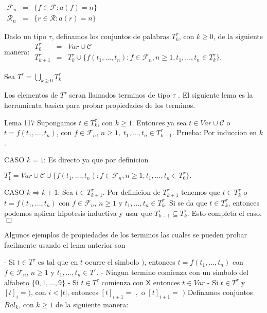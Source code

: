 \(\displaystyle \begin{array}{rcl} \mathcal{F}_{n} & =& \{f\in \mathcal{F}:a(f)=n\} \\ \mathcal{R}_{n} & =& \{r\in \mathcal{R}:a(r)=n\} \end{array} \)

Dado un tipo \(\tau \), definamos los conjuntos de palabras \(T_{k}^{\tau }\), con \(k\geq 0\), de la siguiente manera:
\(\displaystyle \begin{array}{rcl} T_{0}^{\tau } & =& Var\cup \mathcal{C} \\ T_{k+1}^{\tau } & =& T_{k}^{\tau }\cup \{f(t_{1},...,t_{n}):f\in \mathcal{F} _{n},n\geq 1,t_{1},...,t_{n}\in T_{k}^{\tau }\}. \end{array} \)

Sea
\(\displaystyle T^{\tau }=\bigcup_{k\geq 0}T_{k}^{\tau } \)

Los elementos de \(T^{\tau }\) seran llamados terminos de tipo \(\tau \) .
El siguiente lema es la herramienta basica para probar propiedades de los terminos.

Lema 117 Supongamos \(t\in T_{k}^{\tau }\), con \(k\geq 1\). Entonces ya sea \(t\in Var\cup \mathcal{C}\) o \(t=f(t_{1},...,t_{n})\), con \(f\in \mathcal{F }_{n}\), \(n\geq 1,\;t_{1},...,t_{n}\in T_{k-1}^{\tau }\).
Prueba: Por induccion en \(k\).

CASO \(k=1\): Es directo ya que por definicion

\(\displaystyle T_{1}^{\tau }=Var\cup \mathcal{C}\cup \{f(t_{1},...,t_{n}):f\in \mathcal{F} _{n},n\geq 1,t_{1},...,t_{n}\in T_{0}^{\tau }\}. \)

CASO \(k\Rightarrow k+1\): Sea \(t\in T_{k+1}^{\tau }\). Por definicion de \( T_{k+1}^{\tau }\) tenemos que \(t\in T_{k}^{\tau }\) o \(t=f(t_{1},...,t_{n})\) con \(f\in \mathcal{F}_{n}\), \(n\geq 1\) y \(t_{1},...,t_{n}\in T_{k}^{\tau }\). Si se da que \(t\in T_{k}^{\tau }\), entonces podemos aplicar hipotesis inductiva y usar que \(T_{k-1}^{\tau }\subseteq T_{k}^{\tau }\). Esto completa el caso. \(\Box\)

Algunos ejemplos de propiedades de los terminos las cuales se pueden probar facilmente usando el lema anterior son

- Si \(t\in T^{\tau }\) es tal que en \(t\) ocurre el simbolo \()\), entonces \(t=f(t_{1},...,t_{n})\) con \(f\in \mathcal{F}_{n}\), \(n\geq 1\) y \( t_{1},...,t_{n}\in T^{\tau }\).
- Ningun termino comienza con un simbolo del alfabeto \(\{\mathit{0}, \mathit{1},...,\mathit{9}\}\)
- Si \(t\in T^{\tau }\) comienza con \(\mathsf{X}\) entonces \(t\in Var\)
- Si \(t\in T^{\tau }\) y \(\left[ t\right] _{i}=)\), con \(i< \left\vert t\right\vert \), entonces \(\left[ t\right] _{i+1}=\) \(,\) o \(\left[ t\right] _{i+1}=\) \()\)
Definamos conjuntos \(Bal_{k}\), con \(k\geq 1\) de la siguiente manera:

